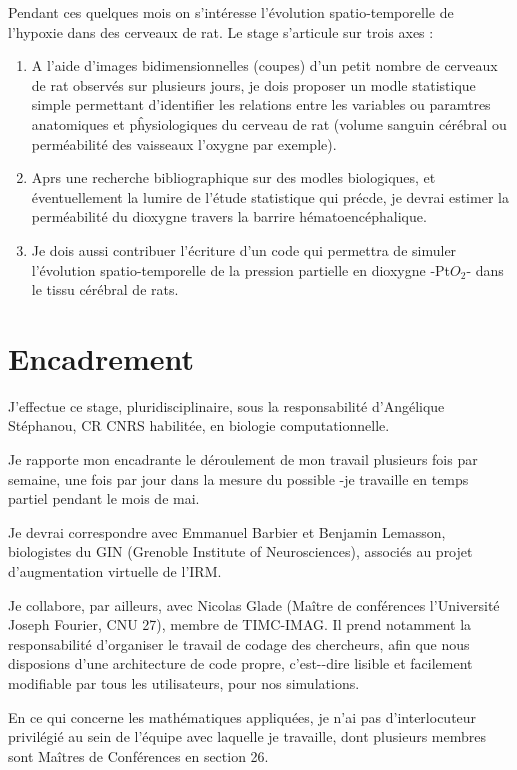 \documentclass[a4paper,10pt]{article}
\begin{document}
\ligneinter
Pendant ces quelques mois on s'int\'eresse  l'\'evolution spatio-temporelle de l'hypoxie dans des cerveaux de rat. Le stage s'articule sur trois axes :
\begin{enumerate}
\item A l'aide d'images bidimensionnelles (coupes) d'un petit nombre de cerveaux de rat observ\'es sur plusieurs jours, %
je dois proposer un modle statistique simple permettant d'identifier les relations entre les variables ou paramtres anatomiques et pĥysiologiques du cerveau de rat %
(volume sanguin c\'er\'ebral ou perm\'eabilit\'e des vaisseaux  l'oxygne par exemple).
%
\item Aprs une recherche bibliographique sur des modles biologiques, et \'eventuellement  la lumire de l'\'etude statistique qui pr\'ecde, %
je devrai estimer la perm\'eabilit\'e du dioxygne  travers la barrire h\'ematoenc\'ephalique.
%
\item Je dois aussi contribuer  l'\'ecriture d'un code qui permettra de simuler l'\'evolution spatio-temporelle de la pression partielle en dioxygne %
-Pt$O_2$- dans le tissu c\'er\'ebral de rats.
\end{enumerate}

\newpage
\section{Encadrement}

J'effectue ce stage, pluridisciplinaire, sous la responsabilit\'e d'Ang\'elique St\'ephanou, CR CNRS habilit\'ee, en biologie computationnelle.

\par
Je rapporte  mon encadrante le d\'eroulement de mon travail plusieurs fois par semaine, une fois par jour dans la mesure du possible -je travaille en temps partiel pendant le mois de mai.

\par
Je devrai correspondre avec Emmanuel Barbier et Benjamin Lemasson, biologistes du GIN (Grenoble Institute of Neurosciences), associ\'es au projet d'augmentation virtuelle de l'IRM.

\par
Je collabore, par ailleurs, avec Nicolas Glade (Ma\^itre de conf\'erences  l'Universit\'e Joseph Fourier, CNU 27), membre de TIMC-IMAG. %
Il prend notamment la responsabilit\'e d'organiser le travail de codage des chercheurs, afin que nous disposions d'une architecture de code propre, %
c'est--dire lisible et facilement modifiable par tous les utilisateurs, pour nos simulations.

\etoile
En ce qui concerne les math\'ematiques appliqu\'ees, je n'ai pas d'interlocuteur privil\'egi\'e au sein de l'\'equipe avec laquelle je travaille, %
dont plusieurs membres sont Ma\^itres de Conf\'erences en section 26.




\end{document}
